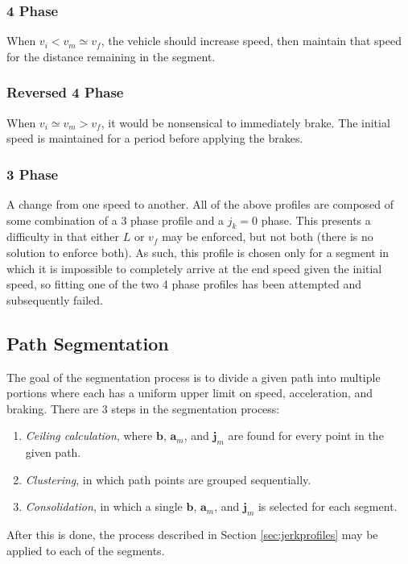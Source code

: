 \documentclass[letterpaper, 10 pt, conference]{ieeeconf}  %
\begin{document}
\subsubsection{4 Phase} \label{sec:4phase}

When $v_i < v_m \simeq v_f$, the vehicle should increase speed, then maintain that speed for the distance remaining in the segment.


\subsubsection{Reversed 4 Phase} \label{sec:reversed4phase}

When $v_i \simeq v_m > v_f$, it would be nonsensical to immediately brake.
The initial speed is maintained for a period before applying the brakes.


\subsubsection{3 Phase} \label{sec:3phase}

A change from one speed to another.
All of the above profiles are composed of some combination of a 3 phase profile and a $j_k = 0$ phase.
This presents a difficulty in that either $L$ or $v_f$ may be enforced, but not both (there is no solution to enforce both).
As such, this profile is chosen only for a segment in which it is impossible to completely arrive at the end speed given the initial speed, so fitting one of the two 4 phase profiles has been attempted and subsequently failed.



\subsection{Path Segmentation} \label{sec:pathsegmentation}

The goal of the segmentation process is to divide a given path into multiple portions where each has a uniform upper limit on speed, acceleration, and braking.
There are 3 steps in the segmentation process:
\begin{enumerate} \label{asdf}
  \item \emph{Ceiling calculation}, where $\mathbf{b}$, $\mathbf{a}_m$, and $\mathbf{j}_m$ are found for every point in the given path.
  \item \emph{Clustering}, in which path points are grouped sequentially.
  \item \emph{Consolidation}, in which a single $\mathbf{b}$, $\mathbf{a}_m$, and $\mathbf{j}_m$ is selected for each segment.
\end{enumerate}
After this is done, the process described in Section \ref{sec:jerkprofiles} may be applied to each of the segments.
\end{document}

